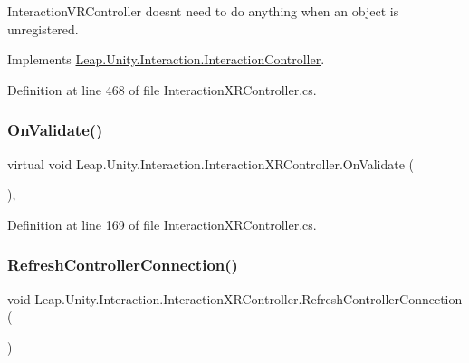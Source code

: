 Interaction\+V\+R\+Controller doesn\textquotesingle{}t need to do anything when an object is unregistered. 



Implements \mbox{\hyperlink{class_leap_1_1_unity_1_1_interaction_1_1_interaction_controller_a0798edd8ad92d6b7f6229e3d9ac26d07}{Leap.\+Unity.\+Interaction.\+Interaction\+Controller}}.



Definition at line 468 of file Interaction\+X\+R\+Controller.\+cs.

\mbox{\label{class_leap_1_1_unity_1_1_interaction_1_1_interaction_x_r_controller_ac43db0f1fd87084d1b1468ce95bd58ac}} 
\subsubsection{\texorpdfstring{OnValidate()}{OnValidate()}}
{\footnotesize\ttfamily virtual void Leap.\+Unity.\+Interaction.\+Interaction\+X\+R\+Controller.\+On\+Validate (\begin{DoxyParamCaption}{ }\end{DoxyParamCaption})\hspace{0.3cm}{\ttfamily [protected]}, {\ttfamily [virtual]}}



Definition at line 169 of file Interaction\+X\+R\+Controller.\+cs.

\mbox{\label{class_leap_1_1_unity_1_1_interaction_1_1_interaction_x_r_controller_a84947d3cd2c236dab7849e2d805465b6}} 
\subsubsection{\texorpdfstring{RefreshControllerConnection()}{RefreshControllerConnection()}}
{\footnotesize\ttfamily void Leap.\+Unity.\+Interaction.\+Interaction\+X\+R\+Controller.\+Refresh\+Controller\+Connection (\begin{DoxyParamCaption}{ }\end{DoxyParamCaption})}



